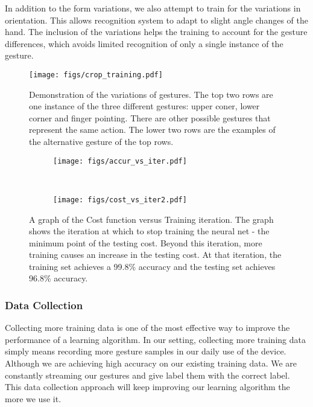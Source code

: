\documentclass[conference]{IEEEtran}
\begin{document}
In addition to the form variations, we also attempt to train for the variations in orientation. This allows recognition system to adapt to slight angle changes of the hand. The inclusion of the variations helps the training to account for the gesture differences, which avoids limited recognition of only a single instance of the gesture.
\begin{figure} \centering \texttt{[image: figs/crop\_training.pdf]} \caption{Demonstration of the variations of gestures. The top two rows are one instance of the three different gestures: upper coner, lower corner and finger pointing. There are other possible gestures that represent the same action. The lower two rows are the examples of the alternative gesture of the top rows.}\label{gesture_data} \end{figure}
\begin{figure}
\centering
\begin{subfigure}[b]{\columnwidth}
\centering
\texttt{[image: figs/accur\_vs\_iter.pdf]}
\end{subfigure}
\\
\vspace{10pt}
\begin{subfigure}[b]{\columnwidth}
\centering
\texttt{[image: figs/cost\_vs\_iter2.pdf]}
\end{subfigure}
\caption{A graph of the Cost function versus Training iteration. The graph shows the iteration at which to stop training the neural net - the minimum point of the testing cost. Beyond this iteration, more training causes an increase in the testing cost. At that iteration, the training set achieves a 99.8\% accuracy and the testing set achieves 96.8\% accuracy.}
\label{stop_graph}
\end{figure}
\subsubsection{Data Collection}
Collecting more training data is one of the most effective way to improve the performance of a learning algorithm. In our setting, collecting more training data simply means recording more gesture samples  in our daily use of the device. Although we are achieving high accuracy on our existing training data. We are constantly streaming our gestures and give label them with the correct label. This data collection approach will keep improving our learning algorithm the more we use it.
\end{document}
